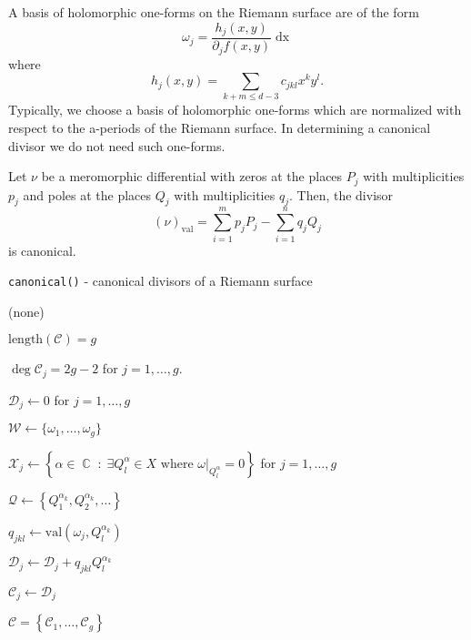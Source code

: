 \documentclass[12]{article}
\DeclareMathOperator{\CC}{\mathbb{C}}
\DeclareMathOperator{\dx}{dx}
\begin{document}
A basis of holomorphic one-forms on the Riemann surface are of the form
\[
    \omega_j = \frac{h_j(x,y)}{\partial_j f(x,y)} \dx
\]
where
\[
    h_j(x,y) = \sum_{k+m \leq d-3} c_{jkl}x^ky^l.
\]
Typically, we choose a basis of holomorphic one-forms which are
normalized with respect to the a-periods of the Riemann surface. In
determining a canonical divisor we do not need such one-forms.

Let $\nu$ be a meromorphic differential with zeros at the places $P_j$
with multiplicities $p_j$ and poles at the places $Q_j$ with
multiplicities $q_j$. Then, the divisor
\begin{equation} \label{eqn: valuation divisor}
  (\nu)_\text{val} = \sum_{i=1}^m p_jP_j - \sum_{i=1}^n q_jQ_j
\end{equation}
is canonical.


\begin{algorithm}
\caption{{\tt canonical()} - canonical divisors of a Riemann surface}
\label{alg: canonical}
\begin{algorithmic}[1]
\Require (none)

\Ensure $\text{length}(\mathcal{C}) = g$

\Ensure $\deg \mathcal{C}_j = 2g - 2$ for $j = 1, \ldots, g$.

\State $\mathcal{D}_j \gets 0$ for $j = 1, \ldots, g$

\State $\mathcal{W} \gets \{\omega_1, \ldots, \omega_g\}$

\State $\mathcal{X}_j \gets \left\{ \alpha \in \CC \; : \; \exists
Q_l^{\alpha} \in X \text{ where } \omega \big|_{Q_l^\alpha} = 0
\right\}$ for $j = 1, \ldots, g$



        \State $\mathcal{Q} \gets \left\{ Q_1^{\alpha_k}, Q_2^{\alpha_k},
        \ldots \right\}$


            \State $q_{jkl} \gets \text{val}\left(\omega_j,
            Q_l^{\alpha_k}\right)$

            \EndIf


            \State $\mathcal{D}_j \gets \mathcal{D}_j + q_{jkl}
            Q_l^{\alpha_k}$


                \State $\mathcal{C}_j \gets \mathcal{D}_j$

            \EndIf

        \EndFor

    \EndFor

\EndFor

 $\mathcal{C} = \left\{ \mathcal{C}_1, \ldots,
\mathcal{C}_g \right\}$

\end{algorithmic}
\end{algorithm}
\end{document}
